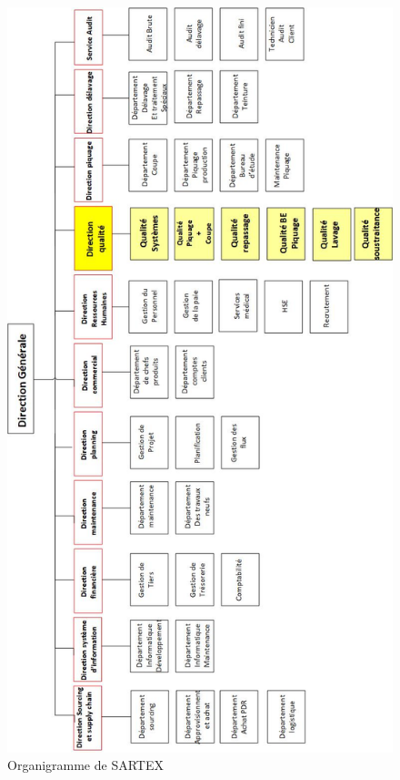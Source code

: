 \documentclass[12pt, a4paper]{thesis}
\begin{document}
\begin{figure}[!h]
\begin{center}
        \includegraphics[scale=0.6]{orga.jpg}
        
        \caption{Organigramme de SARTEX}
\end{center}
\end{figure}
\end{document}
